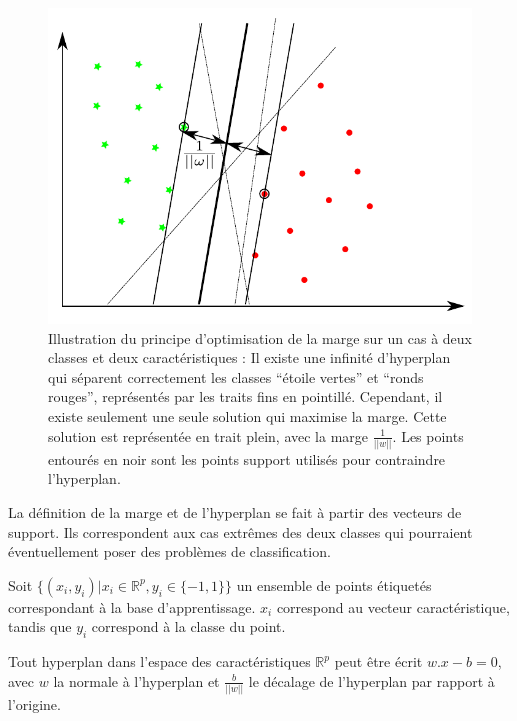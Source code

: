 \begin{figure}[h]
	\label{fig:multiPlansSeparationSVM}
	\begin{center}
	\includegraphics[width=13cm]{images/multiPlansSeparationSVM}
	\end{center}
	\caption[Illustration du principe d'optimisation de la marge sur le SVM]{Illustration du principe d'optimisation de la marge sur un cas à deux classes et deux caractéristiques : Il existe une infinité d'hyperplan qui séparent correctement les classes ``étoile vertes'' et ``ronds rouges'', représentés par les traits fins en pointillé. Cependant, il existe seulement une seule solution qui maximise la marge. Cette solution est représentée en trait plein, avec la marge $\frac{1}{||w||}$. Les points entourés en noir sont les points support utilisés pour contraindre l'hyperplan. }
\end{figure}


La définition de la marge et de l'hyperplan se fait à partir des vecteurs de support. Ils correspondent aux cas extrêmes des deux classes qui pourraient éventuellement poser des problèmes de classification.


Soit $\{(x_i, y_i) | x_i \in \mathbb{R}^p , y_i \in \{ -1, 1 \} \}$ un ensemble de points étiquetés correspondant à la base d'apprentissage. $x_i$ correspond au vecteur caractéristique, tandis que $y_i$ correspond à la classe du point.

Tout hyperplan dans l'espace des caractéristiques $\mathbb{R}^p$ peut être écrit $w . x - b = 0$, avec $w$ la normale à l'hyperplan et $\frac{b}{ ||w|| }$ le décalage de l'hyperplan par rapport à l'origine. 

